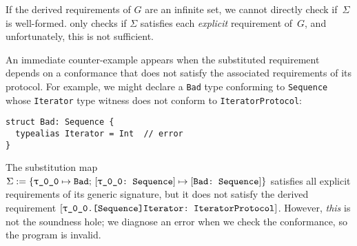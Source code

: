 \documentclass[../generics]{subfiles}
\begin{document}
If the derived requirements of $G$ are an infinite set, we cannot directly check if~$\Sigma$ is well-formed.  only checks if $\Sigma$ satisfies each \emph{explicit} requirement of~$G$, and unfortunately, this is not sufficient.

An immediate counter-example appears when the substituted requirement depends on a conformance that does not satisfy the associated requirements of its protocol. For example, we might declare a \texttt{Bad} type conforming to \texttt{Sequence} whose \texttt{Iterator} type witness does not conform to \texttt{IteratorProtocol}:
\begin{Verbatim}
struct Bad: Sequence {
  typealias Iterator = Int  // error
}
\end{Verbatim}
The substitution map
$\Sigma:=\SubstMapC{\SubstType{\ttgp{0}{0}}{Bad}}{\SubstConf{\ttgp{0}{0}}{Bad}{Sequence}}$ satisfies all explicit requirements of its generic signature, but it does not satisfy the derived requirement $\ConfReq{\ttgp{0}{0}.[Sequence]Iterator}{IteratorProtocol}$. However, \emph{this} is not the soundness hole; we diagnose an error when we check the conformance, so the program is invalid.
\end{document}
